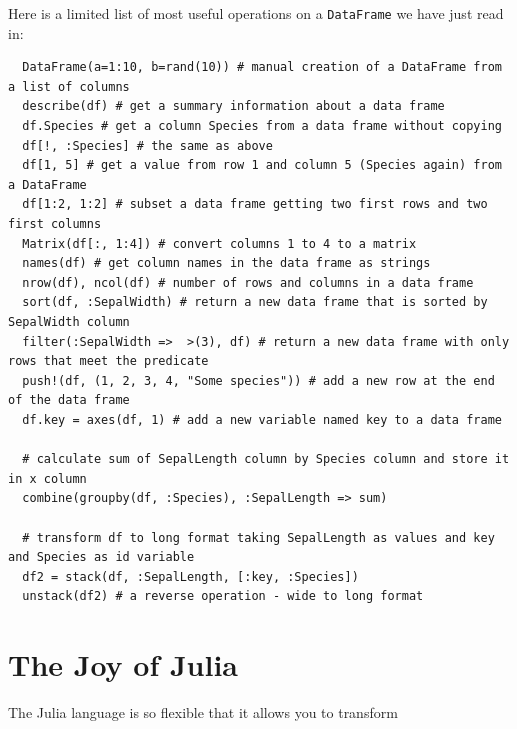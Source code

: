 \documentclass[10pt,a4paper]{article}
\begin{document}
Here is a limited list of most useful operations on a \lstinline|DataFrame| we have just read in:
\begin{lstlisting}
  DataFrame(a=1:10, b=rand(10)) # manual creation of a DataFrame from a list of columns
  describe(df) # get a summary information about a data frame
  df.Species # get a column Species from a data frame without copying
  df[!, :Species] # the same as above
  df[1, 5] # get a value from row 1 and column 5 (Species again) from a DataFrame
  df[1:2, 1:2] # subset a data frame getting two first rows and two first columns
  Matrix(df[:, 1:4]) # convert columns 1 to 4 to a matrix
  names(df) # get column names in the data frame as strings
  nrow(df), ncol(df) # number of rows and columns in a data frame
  sort(df, :SepalWidth) # return a new data frame that is sorted by SepalWidth column
  filter(:SepalWidth =>  >(3), df) # return a new data frame with only rows that meet the predicate
  push!(df, (1, 2, 3, 4, "Some species")) # add a new row at the end of the data frame
  df.key = axes(df, 1) # add a new variable named key to a data frame

  # calculate sum of SepalLength column by Species column and store it in x column
  combine(groupby(df, :Species), :SepalLength => sum)

  # transform df to long format taking SepalLength as values and key and Species as id variable
  df2 = stack(df, :SepalLength, [:key, :Species])
  unstack(df2) # a reverse operation - wide to long format
\end{lstlisting}

\section{The Joy of Julia}

The Julia language is so flexible that it allows you to transform
\end{document}
